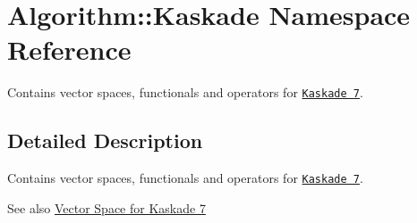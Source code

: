 \hypertarget{namespaceAlgorithm_1_1Kaskade}{}\section{Algorithm\+:\+:Kaskade Namespace Reference}
\label{namespaceAlgorithm_1_1Kaskade}


Contains vector spaces, functionals and operators for \href{http://www.zib.de/projects/kaskade7-finite-element-toolbox}{\tt Kaskade 7}.  




\subsection{Detailed Description}
Contains vector spaces, functionals and operators for \href{http://www.zib.de/projects/kaskade7-finite-element-toolbox}{\tt Kaskade 7}. 

\begin{DoxySeeAlso}{See also}
\hyperlink{group__KaskadeGroup}{Vector Space for Kaskade 7} 
\end{DoxySeeAlso}

